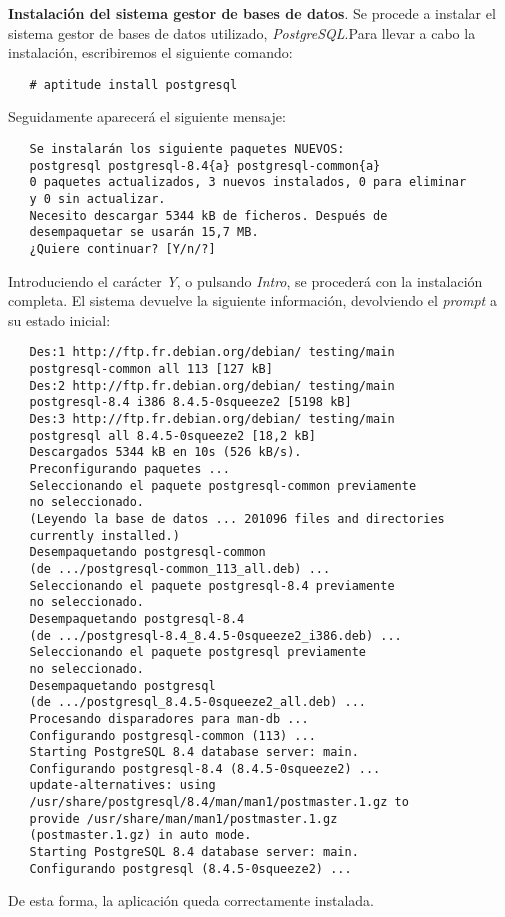 \item \textbf{Instalación del sistema gestor de bases de datos}.
   Se procede a instalar el sistema gestor de bases de datos utilizado,
   \textit{PostgreSQL}.Para llevar a cabo la instalación, escribiremos el
   siguiente comando:

   \begin{verbatim}
   # aptitude install postgresql
   \end{verbatim}

   Seguidamente aparecerá el siguiente mensaje:

   \begin{verbatim}
   Se instalarán los siguiente paquetes NUEVOS:
   postgresql postgresql-8.4{a} postgresql-common{a}
   0 paquetes actualizados, 3 nuevos instalados, 0 para eliminar
   y 0 sin actualizar.
   Necesito descargar 5344 kB de ficheros. Después de
   desempaquetar se usarán 15,7 MB.
   ¿Quiere continuar? [Y/n/?]
   \end{verbatim}

   Introduciendo el carácter \textit{Y}, o pulsando \textit{Intro}, se procederá
   con la instalación completa. El sistema devuelve la siguiente información,
   devolviendo el \textit{prompt} a su estado inicial:

   \begin{verbatim}
   Des:1 http://ftp.fr.debian.org/debian/ testing/main
   postgresql-common all 113 [127 kB]
   Des:2 http://ftp.fr.debian.org/debian/ testing/main
   postgresql-8.4 i386 8.4.5-0squeeze2 [5198 kB]
   Des:3 http://ftp.fr.debian.org/debian/ testing/main
   postgresql all 8.4.5-0squeeze2 [18,2 kB]
   Descargados 5344 kB en 10s (526 kB/s).
   Preconfigurando paquetes ...
   Seleccionando el paquete postgresql-common previamente
   no seleccionado.
   (Leyendo la base de datos ... 201096 files and directories
   currently installed.)
   Desempaquetando postgresql-common
   (de .../postgresql-common_113_all.deb) ...
   Seleccionando el paquete postgresql-8.4 previamente
   no seleccionado.
   Desempaquetando postgresql-8.4
   (de .../postgresql-8.4_8.4.5-0squeeze2_i386.deb) ...
   Seleccionando el paquete postgresql previamente
   no seleccionado.
   Desempaquetando postgresql
   (de .../postgresql_8.4.5-0squeeze2_all.deb) ...
   Procesando disparadores para man-db ...
   Configurando postgresql-common (113) ...
   Starting PostgreSQL 8.4 database server: main.
   Configurando postgresql-8.4 (8.4.5-0squeeze2) ...
   update-alternatives: using
   /usr/share/postgresql/8.4/man/man1/postmaster.1.gz to
   provide /usr/share/man/man1/postmaster.1.gz
   (postmaster.1.gz) in auto mode.
   Starting PostgreSQL 8.4 database server: main.
   Configurando postgresql (8.4.5-0squeeze2) ...
   \end{verbatim}

   De esta forma, la aplicación queda correctamente instalada.
